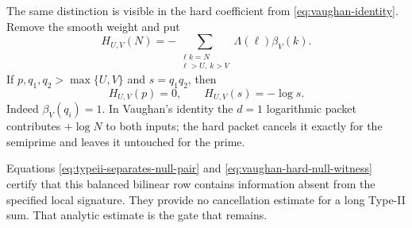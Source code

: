 The same distinction is visible in the hard coefficient from
\eqref{eq:vaughan-identity}.  Remove the smooth weight and put
\begin{equation}
 H_{U,V}(N)=
 -\sum_{\substack{\ell k=N\\\ell>U,\ k>V}}
 \Lambda(\ell)\beta_V(k).
 \label{eq:finite-vaughan-hard-row}
\end{equation}
If $p,q_1,q_2>\max\{U,V\}$ and $s=q_1q_2$, then
\begin{equation}
 H_{U,V}(p)=0,
 \qquad
 H_{U,V}(s)=-\log s.
 \label{eq:vaughan-hard-null-witness}
\end{equation}
Indeed $\beta_V(q_i)=1$.  In Vaughan's identity the $d=1$ logarithmic
packet contributes $+\log N$ to both inputs; the hard packet cancels it
exactly for the semiprime and leaves it untouched for the prime.

Equations \eqref{eq:typeii-separates-null-pair} and
\eqref{eq:vaughan-hard-null-witness} certify that this balanced bilinear
row contains information absent from the specified local signature.  They
provide no cancellation estimate for a long Type-II sum.  That analytic
estimate is the gate that remains.
